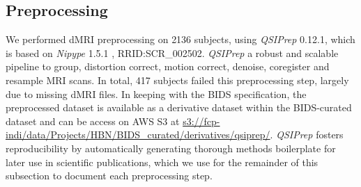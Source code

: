 \documentclass[fleqn,10pt]{wlscirep}
\begin{document}
\subsection*{Preprocessing}

We performed dMRI preprocessing on \num{2136} subjects, using \emph{QSIPrep}
\cite{cieslak2021-iq} 0.12.1, which is based on \emph{Nipype} 1.5.1
\cite{nipype1,nipype2}, RRID:SCR\_002502. \emph{QSIPrep} a robust and scalable
pipeline to group, distortion correct, motion correct, denoise, coregister and
resample MRI scans.  In total, \num{417} subjects failed this preprocessing
step, largely due to missing dMRI files. In keeping with the BIDS specification,
the preprocessed dataset is available as a derivative dataset within the
BIDS-curated dataset and can be access on AWS S3 at
\url{s3://fcp-indi/data/Projects/HBN/BIDS_curated/derivatives/qsiprep/}.
\emph{QSIPrep} fosters reproducibility by automatically generating thorough
methods boilerplate for later use in scientific publications, which we use for
the remainder of this subsection to document each preprocessing step.
\end{document}
